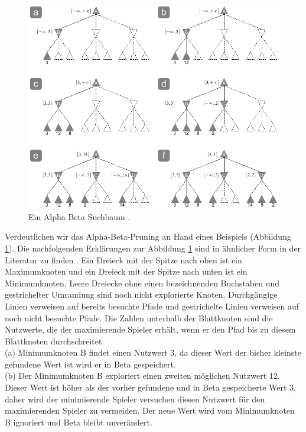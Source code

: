 \begin{figure}[!htbp]
  \centering
  \includegraphics[scale = 0.8]{inhalt/abbildungen/alpha_beta_suchbaum.pdf}
  \caption{Ein Alpha Beta Suchbaum \cite[213]{Russell}.}
  \label{fig:alpha_beta}
\end{figure} 

Verdeutlichen wir das Alpha-Beta-Pruning an Hand eines Beispiels (Abbildung \ref{fig:alpha_beta}). Die nachfolgenden Erklärungen zur Abbildung \ref{fig:alpha_beta} sind in ähnlicher Form in der Literatur zu finden \cite[212 \psqq]{Russell}. Ein Dreieck mit der Spitze nach oben ist ein Maximumknoten und ein Dreieck mit der Spitze nach unten ist ein Minimumknoten. Leere Dreiecke ohne einen bezeichnenden Buchstaben und gestrichelter Umrandung sind noch nicht explorierte Knoten. Durchgängige Linien verweisen auf bereits besuchte Pfade und gestrichelte Linien verweisen auf noch nicht besuchte Pfade. Die Zahlen unterhalb der Blattknoten sind die Nutzwerte, die der maximierende Spieler erhält, wenn er den Pfad bis zu diesem Blattknoten durchschreitet. \\

(a) Minimumknoten B findet einen Nutzwert 3, da dieser Wert der bisher kleinste gefundene Wert ist wird er in Beta gespeichert. \\

(b) Der Minimumknoten B exploriert einen zweiten möglichen Nutzwert 12. Dieser Wert ist höher als der vorher gefundene und in Beta gespeicherte Wert 3, daher wird der minimierende Spieler versuchen diesen Nutzwert für den maximierenden Spieler zu vermeiden. Der neue Wert wird vom Minimumknoten B ignoriert und Beta bleibt unverändert. \\

